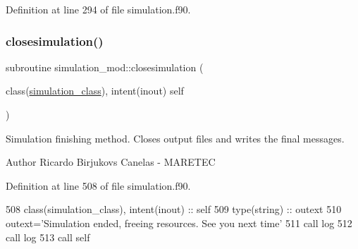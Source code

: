 Definition at line 294 of file simulation.\+f90.


\mbox{\label{namespacesimulation__mod_a4285722eaa589fa671233554b54c74f8}} 
\subsubsection{\texorpdfstring{closesimulation()}{closesimulation()}}
{\footnotesize\ttfamily subroutine simulation\+\_\+mod\+::closesimulation (\begin{DoxyParamCaption}\item[{class(\mbox{\hyperlink{structsimulation__mod_1_1simulation__class}{simulation\+\_\+class}}), intent(inout)}]{self }\end{DoxyParamCaption})\hspace{0.3cm}{\ttfamily [private]}}



Simulation finishing method. Closes output files and writes the final messages. 

\begin{DoxyAuthor}{Author}
Ricardo Birjukovs Canelas -\/ M\+A\+R\+E\+T\+EC 
\end{DoxyAuthor}


Definition at line 508 of file simulation.\+f90.


\begin{DoxyCode}
508     \textcolor{keywordtype}{class}(simulation\_class), \textcolor{keywordtype}{intent(inout)} :: self
509     \textcolor{keywordtype}{type}(string) :: outext
510     outext=\textcolor{stringliteral}{'Simulation ended, freeing resources. See you next time'}
511     \textcolor{keyword}{call }log%
512     \textcolor{keyword}{call }log%
513     \textcolor{keyword}{call }self%
\end{DoxyCode}
\mbox{\label{namespacesimulation__mod_a2b8198a9fb3f7671c6b45192a0b9740c}} 
